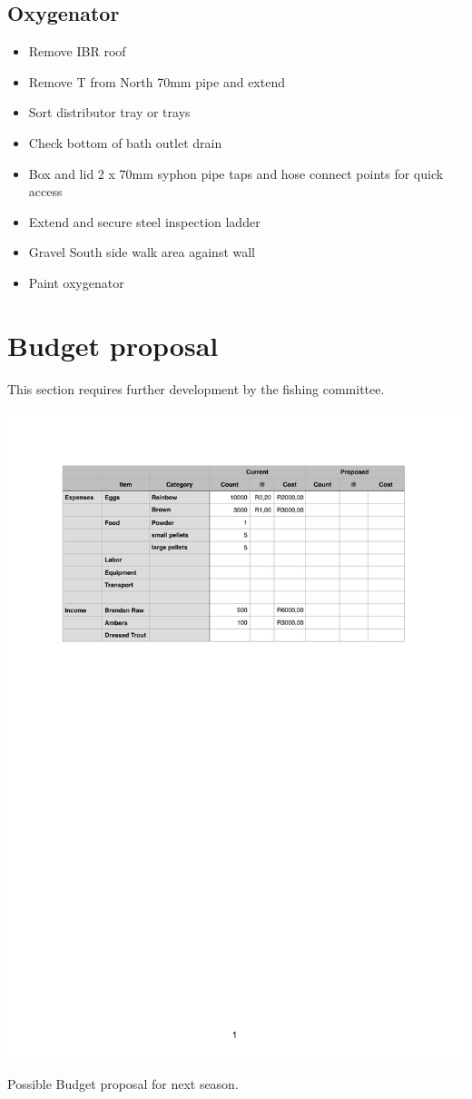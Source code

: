 \subsection{Oxygenator}
\begin{itemize}
\item  Remove IBR roof
\item Remove T from North 70mm pipe and extend  
\item Sort distributor tray or trays
\item Check bottom of bath outlet drain
\item Box and lid 2 x 70mm syphon pipe taps and hose connect points for quick access
\item Extend and secure steel inspection ladder
\item Gravel South side walk area against wall
\item Paint oxygenator
\end{itemize}


\section{Budget proposal}

This section requires further development by the fishing committee.

\begin{table}[H]
  \centering
  \includegraphics[scale = 0.9]{tables/TablesBudget.pdf}
   \caption{Possible Budget proposal for next season.}
  \label{tab:Budget}
\end{table}
 



